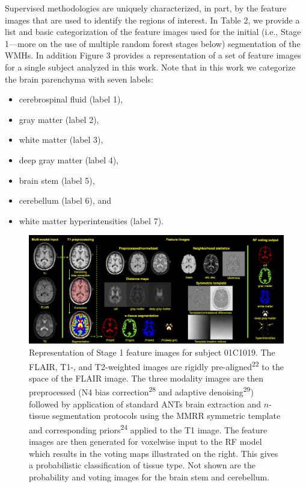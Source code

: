 \documentclass[11pt,]{article}
\providecommand{\tightlist}{%
  \setlength{\itemsep}{0pt}\setlength{\parskip}{0pt}}
\begin{document}


Supervised methodologies are uniquely characterized, in part, by the
feature images that are used to identify the regions of interest. In
Table 2, we provide a list and basic categorization of the feature
images used for the initial (i.e., Stage 1---more on the use of multiple
random forest stages below) segmentation of the WMHs. In addition Figure
3 provides a representation of a set of feature images for a single
subject analyzed in this work. Note that in this work we categorize the
brain parenchyma with seven labels:

\begin{itemize}
\tightlist
\item
  cerebrospinal fluid (label 1),
\item
  gray matter (label 2),
\item
  white matter (label 3),
\item
  deep gray matter (label 4),
\item
  brain stem (label 5),
\item
  cerebellum (label 6), and
\item
  white matter hyperintensities (label 7).
\end{itemize}

\begin{figure}[htbp]
\centering
\includegraphics{Figures/featureImages.png}
\caption{Representation of Stage 1 feature images for subject 01C1019.
The FLAIR, T1-, and T2-weighted images are rigidly
pre-aligned\textsuperscript{22} to the space of the FLAIR image. The
three modality images are then preprocessed (N4 bias
correction\textsuperscript{28} and adaptive
denoising\textsuperscript{29}) followed by application of standard ANTs
brain extraction and \(n\)-tissue segmentation protocols using the MMRR
symmetric template and corresponding priors\textsuperscript{24} applied
to the T1 image. The feature images are then generated for voxelwise
input to the RF model which results in the voting maps illustrated on
the right. This gives a probabilistic classification of tissue type. Not
shown are the probability and voting images for the brain stem and
cerebellum.}
\end{figure}
\end{document}
